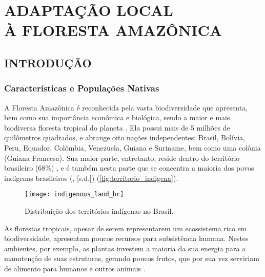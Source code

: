 \chapter[ADAPTAÇÃO LOCAL À FLORESTA AMAZÔNICA]{ADAPTAÇÃO LOCAL\\À FLORESTA AMAZÔNICA}
\label{cap:amazonia}


\section{INTRODUÇÃO}

\subsection{Características e Populações Nativas}

A Floresta Amazônica é reconhecida pela vasta biodiversidade que apresenta, bem como sua importância econômica e biológica, sendo a maior e mais biodiversa floresta tropical do planeta \cite{leal_amazonia_2019,fearnside_destruicao_2020}. Ela possui mais de 5 milhões de quilômetros quadrados, e abrange oito nações independentes: Brasil, Bolívia, Peru, Equador, Colômbia, Venezuela, Guiana e Suriname, bem como uma colônia (Guiana Francesa). Sua maior parte, entretanto, reside dentro do território brasileiro (68\%) \cite{moreira_importancia_2009,leal_amazonia_2019}, e é também nesta parte que se concentra a maioria dos povos indígenas brasileiros (\citeauthor{funai_terras_nodate}, [s.d.]) (\autoref{fig:territorio_indigena}).

\begin{figure}[!htb]
\centering
\texttt{[image: indigenous\_land\_br]}
\caption{Distribuição dos territórios indígenas no Brasil.}
\label{fig:territorio_indigena}
\end{figure}

As florestas tropicais, apesar de serem representarem um ecossistema rico em biodiversidade, apresentam poucos recursos para subsistência humana. Nestes ambientes, por exemplo, as plantas investem a maioria da sua energia para a manutenção de suas estruturas, gerando poucos frutos, que por sua vez serviriam de alimento para humanos e outros animais \cite{bailey_hunting_1989}.

